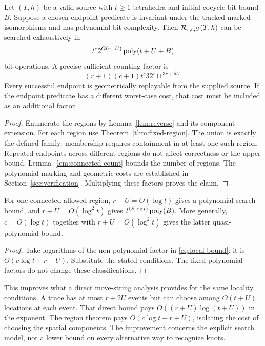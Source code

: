 \begin{theorem}\label{thm:local}
Let $(T,h)$ be a valid source with $t\ge1$ tetrahedra and initial cocycle
bit bound $B$. Suppose a chosen endpoint predicate is invariant under the
tracked marked isomorphisms and has polynomial bit complexity. Then
$\mathcal R_{r,c,U}(T,h)$ can be searched exhaustively in
\begin{equation}\label{eq:local-bound}
 t^c2^{O(r+U)}\operatorname{poly}(t+U+B)
\end{equation}
bit operations. A precise sufficient counting factor is
\[
 (r+1)(c+1)t^c32^r11^{3r+5U}.
\]
Every successful endpoint is geometrically replayable from the supplied
source. If the endpoint predicate has a different worst-case cost, that
cost must be included as an additional factor.
\end{theorem}
\begin{proof}
Enumerate the regions by Lemma~\ref{lem:reverse} and its component extension.
For each region use Theorem~\ref{thm:fixed-region}. The union is exactly the
defined family: membership requires containment in at least one such region.
Repeated endpoints across different regions do not affect correctness or
the upper bound. Lemma~\ref{lem:connected-count} bounds the number of regions.
The polynomial marking and geometric costs are established in
Section~\ref{sec:verification}. Multiplying these factors proves the claim.
\end{proof}

\begin{corollary}\label{cor:quasi}
For one connected allowed region, $r+U=O(\log t)$ gives a polynomial search
bound, and $r+U=O(\log^2 t)$ gives $t^{O(\log t)}\operatorname{poly}(B)$.
More generally, $c=O(\log t)$ together with $r+U=O(\log^2 t)$ gives the
latter quasi-polynomial bound.
\end{corollary}
\begin{proof}
Take logarithms of the non-polynomial factor in
\eqref{eq:local-bound}: it is $O(c\log t+r+U)$. Substitute the stated
conditions. The fixed polynomial factors do not change these classifications.
\end{proof}

This improves what a direct move-string analysis provides for the same
locality conditions. A trace has at most $r+2U$ events but can choose among
$O(t+U)$ locations at each event. That direct bound pays
$O((r+U)\log(t+U))$ in the exponent. The region theorem pays
$O(c\log t+r+U)$, isolating the cost of choosing the spatial components.
The improvement concerns the explicit search model, not a lower bound on
every alternative way to recognize knots.

